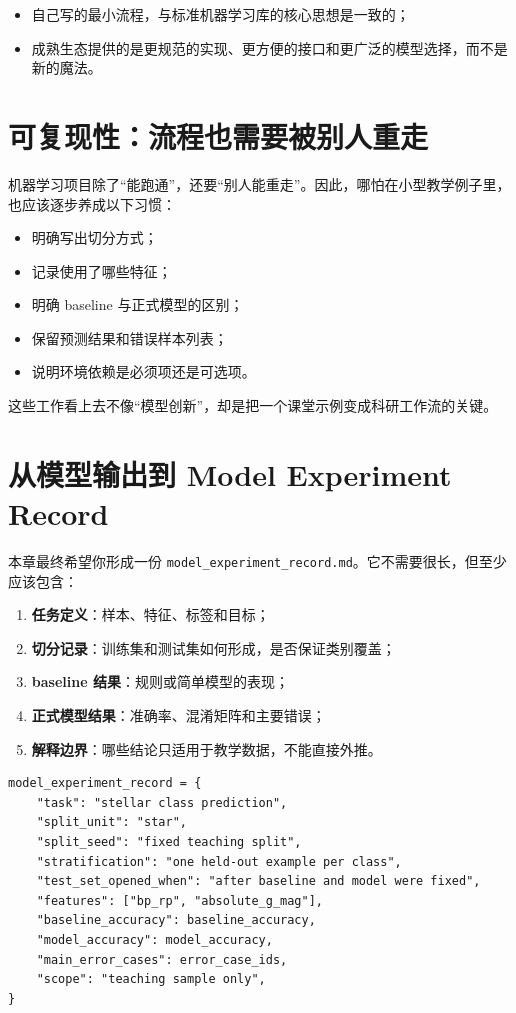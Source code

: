 \begin{itemize}
    \item 自己写的最小流程，与标准机器学习库的核心思想是一致的；
    \item 成熟生态提供的是更规范的实现、更方便的接口和更广泛的模型选择，而不是新的魔法。
\end{itemize}

\section{可复现性：流程也需要被别人重走}

机器学习项目除了“能跑通”，还要“别人能重走”。因此，哪怕在小型教学例子里，也应该逐步养成以下习惯：

\begin{itemize}
    \item 明确写出切分方式；
    \item 记录使用了哪些特征；
    \item 明确 baseline 与正式模型的区别；
    \item 保留预测结果和错误样本列表；
    \item 说明环境依赖是必须项还是可选项。
\end{itemize}

这些工作看上去不像“模型创新”，却是把一个课堂示例变成科研工作流的关键。

\section{从模型输出到 Model Experiment Record}

本章最终希望你形成一份 \texttt{model\_experiment\_record.md}。它不需要很长，但至少应该包含：

\begin{enumerate}
    \item \textbf{任务定义}：样本、特征、标签和目标；
    \item \textbf{切分记录}：训练集和测试集如何形成，是否保证类别覆盖；
    \item \textbf{baseline 结果}：规则或简单模型的表现；
    \item \textbf{正式模型结果}：准确率、混淆矩阵和主要错误；
    \item \textbf{解释边界}：哪些结论只适用于教学数据，不能直接外推。
\end{enumerate}

\begin{examplebox}
\begin{lstlisting}[style=pythonstyle]
model_experiment_record = {
    "task": "stellar class prediction",
    "split_unit": "star",
    "split_seed": "fixed teaching split",
    "stratification": "one held-out example per class",
    "test_set_opened_when": "after baseline and model were fixed",
    "features": ["bp_rp", "absolute_g_mag"],
    "baseline_accuracy": baseline_accuracy,
    "model_accuracy": model_accuracy,
    "main_error_cases": error_case_ids,
    "scope": "teaching sample only",
}
\end{lstlisting}
\end{examplebox}

